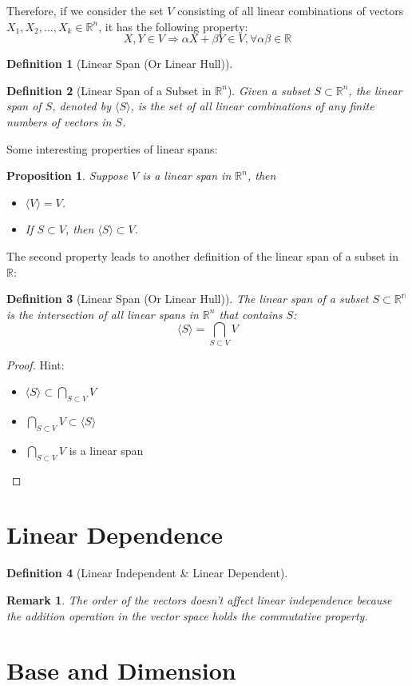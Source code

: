\documentclass[onecolumn]{ctexart}
\newtheorem{definition}{Definition}
\newtheorem{proposition}{Proposition}
\newtheorem{remark}{Remark}
\begin{document}
Therefore, if we consider the set $V$ consisting of all linear combinations of 
vectors $X_1, X_2, \ldots, X_k \in \mathbb{R}^n$, it has the following property:
\[
  X, Y \in V \Rightarrow \alpha X + \beta Y \in V, \forall \alpha \beta \in \mathbb{R}
\]

\begin{definition}[Linear Span (Or Linear Hull)]
  
\end{definition}

\begin{definition}[Linear Span of a Subset in $\mathbb{R}^n$]
  Given a subset $S \subset \mathbb{R}^n$, the linear span of $S$, denoted by 
  $\langle S \rangle$, is the set of all linear combinations of any finite numbers of vectors 
  in $S$.
\end{definition}
Some interesting properties of linear spans:
\begin{proposition}
  Suppose $V$ is a linear span in $\mathbb{R}^n$, then
  \begin{itemize}
    \item $\langle V \rangle = V$.
    \item If $S \subset V$, then $\langle S \rangle \subset V$.
  \end{itemize}
\end{proposition}
The second property leads to another definition of the linear span of a subset in $\mathbb{R}$:
\begin{definition}[Linear Span (Or Linear Hull)]
  The linear span of a subset $S \subset \mathbb{R^n}$ is the intersection of 
  all linear spans in $\mathbb{R}^n$ that contains $S$:
  \[
    \langle S \rangle = \bigcap_{S \subset V} V
  \]
\end{definition}
\begin{proof}
  Hint:
  \begin{itemize}
    \item $\langle S \rangle \subset \bigcap_{S \subset V} V$
    \item $\bigcap_{S \subset V} V \subset \langle S \rangle$
    \item $\bigcap_{S \subset V} V$ is a linear span
  \end{itemize}
\end{proof}

\section{Linear Dependence}

\begin{definition}[Linear Independent \& Linear Dependent]
  
\end{definition}
\begin{remark}
  The order of the vectors doesn't affect linear independence because the 
  addition operation in the vector space holds the commutative property.
\end{remark}

\section{Base and Dimension}
\end{document}
